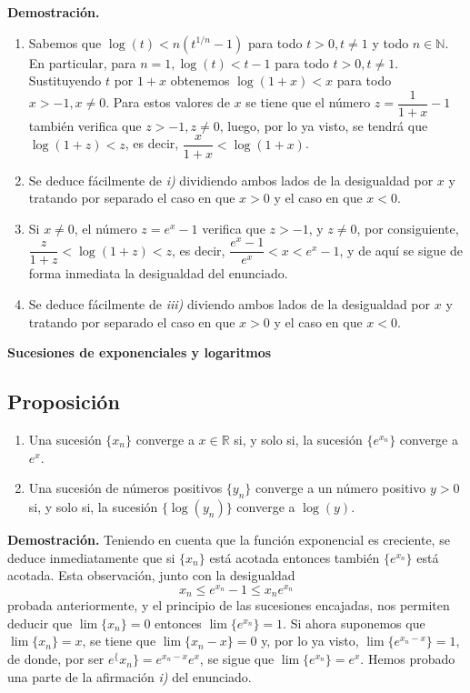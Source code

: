 \documentclass[10pt,a4paper]{article}
\begin{document}
	\textbf{Demostración.} 
	\begin{enumerate}[label=\roman*]
		\item Sabemos que $\log(t) < n(t^{1/n}-1)$ para todo $t > 0, t \neq 1$ y todo $n \in \mathbb{N}$. En particular, para $n = 1, \log(t) < t -1$ para todo $t > 0, t \neq 1$. Sustituyendo $t$ por $1+x$ obtenemos $\log(1+x) < x$ para todo $x > -1, x \neq 0$. Para estos valores de $x$ se tiene que el número $z = \dfrac{1}{1+x}-1$ también verifica que $z > -1, z \neq 0$, luego, por lo ya visto, se tendrá que $\log(1+z) < z$, es decir, $\dfrac{x}{1+x}< \log(1+x)$.
		\item Se deduce fácilmente de \textit{i)} dividiendo ambos lados de la desigualdad por $x$ y tratando por separado el caso en que $x > 0$ y el caso en que $x < 0$.
		\item Si $x \neq 0$, el número $z = e^x-1$ verifica que $z > -1$, y $z \neq 0$, por consiguiente, $\dfrac{z}{1+z} < \log(1+z) < z$, es decir, $\dfrac{e^x-1}{e^x} < x < e^x-1$, y de aquí se sigue de forma inmediata la desigualdad del enunciado.
		\item Se deduce fácilmente de \textit{iii)} diviendo ambos lados de la desigualdad por $x$ y tratando por separado el caso en que $x > 0$ y el caso en que $x < 0$.
	\end{enumerate}

	\vspace{0.3 cm}
	
	\textbf{\Large{Sucesiones de exponenciales y logaritmos}}
	
	\subsection{Proposición}
	
	\begin{enumerate}[label=\roman*]
		\item Una sucesión $\{x_n\}$ converge a $x \in \mathbb{R}$ si, y solo si, la sucesión $\{e^{x_n}\}$ converge a $e^x$.
		\item Una sucesión de números positivos $\{y_n\}$ converge a un número positivo $y > 0$ si, y solo si, la sucesión $\{\log(y_n)\}$ converge a $\log(y)$.
	\end{enumerate}
	
	\textbf{Demostración.} Teniendo en cuenta que la función exponencial es creciente, se deduce inmediatamente que si $\{x_n\}$ está acotada entonces también $\{e^{x_n}\}$ está acotada. Esta observación, junto con la desigualdad $$x_n \leq e^{x_n} - 1 \leq x_n e^{x_n}$$
	probada anteriormente, y el principio de las sucesiones encajadas, nos permiten deducir que $\lim\{x_n\} = 0$ entonces $\lim\{e^{x_n}\} = 1$. Si ahora suponemos que $\lim\{x_n\} = x$, se tiene que $\lim\{x_n-x\} = 0$ y, por lo ya visto, $\lim\{e^{x_n-x}\} = 1$, de donde, por ser $e^\{x_n\} = e^{x_n-x}e^x$, se sigue que $\lim\{e^{x_n}\} = e^x$. Hemos probado una parte de la afirmación \textit{i)} del enunciado.
	
\end{document}
